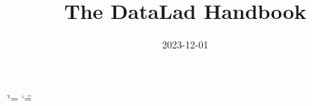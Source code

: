 \documentclass[letterpaper,10pt,english,twoside]{sphinxmanual}
\title{The DataLad Handbook}
\date{2023-12-01}
\author{}
\begin{document}
\ifdefined\shorthandoff
  \ifnum\catcode`\=\string=\active\shorthandoff{=}\fi
  \ifnum\catcode`\"=\active{}\fi
\fi

\pagestyle{empty}
\newcommand{\withauthors}{\mbox{Laura Waite}, \mbox{Kyle Meyer}, \mbox{Marisa Heckner}, \mbox{Benjamin Poldrack}, \mbox{Yaroslav Halchenko}, \mbox{Chris Markiewicz}, \mbox{Pattarawat Chormai}, \mbox{Lisa N. Mochalski}, \mbox{Lisa Wiersch}, \mbox{Jean-Baptiste Poline}, \mbox{Nevena Kraljevic}, \mbox{Alex Waite}, \mbox{Lya K. Paas}, \mbox{Niels Reuter}, \mbox{Peter Vavra}, \mbox{Tobias Kadelka}, \mbox{Peer Herholz}, \mbox{Alexandre Hutton}, \mbox{Sarah Oliveira}, \mbox{Dorian Pustina}, \mbox{Hamzah Hamid Baagil}, \mbox{Tristan Glatard}, \mbox{Giulia Ippoliti}, \mbox{Christian Mönch}, \mbox{Togaru Surya Teja}, \mbox{Dorien Huijser}, \mbox{Ariel Rokem}, \mbox{Remi Gau}, \mbox{Judith Bomba}, \mbox{Konrad Hinsen}, \mbox{Jianxiao Wu}, \mbox{Małgorzata Wierzba}, \mbox{Stefan Appelhoff}, \mbox{Michael Joseph}, \mbox{Tamara Cook}, \mbox{Stephan Heunis}, \mbox{Joerg Stadler}, \mbox{Sin Kim}, \mbox{Oscar Esteban}, \mbox{Michał Szczepanik}, \mbox{Eduard Ort}, \mbox{Myrskyta}, \mbox{Thomas Guiot}, \mbox{Julius Breuer}, \mbox{Ikko Ashimine}, \mbox{Arshitha Basavaraj}, \mbox{Anthony J Veltri}, \mbox{Isil Bilgin}, \mbox{Julian Kosciessa}, \mbox{Isaac To}, \mbox{Austin Macdonald}, \mbox{Christopher S. Hall}, \mbox{John C. Ford}, \mbox{Julien Colomb}, \mbox{Danny Garside}}

\pagestyle{plain}
\sphinxtableofcontents
\pagestyle{normal}
\label{\detokenize{book_main::doc}}


\mainmatter

 \fancyhead[LE]{\small\thepage}
 \fancyhead[RO]{\small\thepage}
 \fancyhead[RE]{\small\nouppercase{\leftmark}}
 \fancyhead[LO]{\small\nouppercase{\rightmark}}
 \fancyfoot{}
 \fancyfoot[LE]{}
 \renewcommand*{\footrule}{}%

\sphinxstepscope
\end{document}
